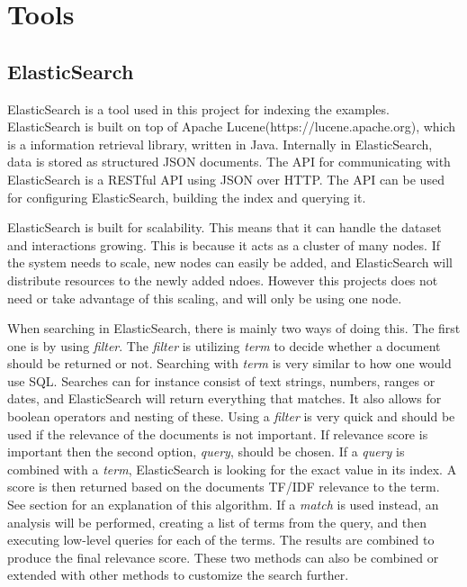 \section{Tools}

\subsection{ElasticSearch} \label{elasticsearch}
ElasticSearch is a tool used in this project for indexing the examples. ElasticSearch is built on top of Apache Lucene(https://lucene.apache.org), which is a information retrieval library, written in Java. Internally in ElasticSearch, data is stored as structured JSON documents. The API for communicating with ElasticSearch is a RESTful API using JSON over HTTP. The API can be used for configuring ElasticSearch, building the index and querying it. 

ElasticSearch is built for scalability. This means that it can handle the dataset and interactions growing. This is because it acts as a cluster of many nodes. If the system needs to scale, new nodes can easily be added, and ElasticSearch will distribute resources to the newly added ndoes. However this projects does not need or take advantage of this scaling, and will only be using one node.

When searching in ElasticSearch, there is mainly two ways of doing this. The first one is by using \textit{filter}. The \textit{filter} is utilizing \textit{term} to decide whether a document should be returned or not. Searching with \textit{term} is very similar to how one would use SQL. %
Searches can for instance consist of text strings, numbers, ranges or dates, and ElasticSearch will return everything that matches. It also allows for boolean operators and nesting of these. Using a \textit{filter} is very quick and should be used if the relevance of the documents is not important. If relevance score is important then the second option, \textit{query}, should be chosen. If a \textit{query} is combined with a \textit{term}, ElasticSearch is looking for the exact value in its index. A score is then returned based on the documents TF/IDF relevance to the term. See section \label{tfidf} for an explanation of this algorithm.%
If a \textit{match} is used instead, an analysis will be performed, creating a list of terms from the query, and then executing low-level queries for each of the terms. The results are combined to produce the final relevance score. These two methods can also be combined or extended with other methods to customize the search further.


